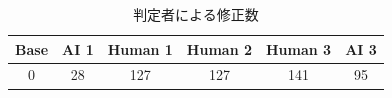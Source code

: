\begin{table}[h]
\begin{center}
\caption{判定者による修正数} \label{tab:countrev}
\begin{tabular}{cccccc}
 {Base} & {AI 1} & {Human 1} & {Human 2} & {Human 3} & {AI 3} \\
\hline
 0 & 28 & 127 & 127 & 141 & 95 \\
\end{tabular}
\end{center}
\end{table}
